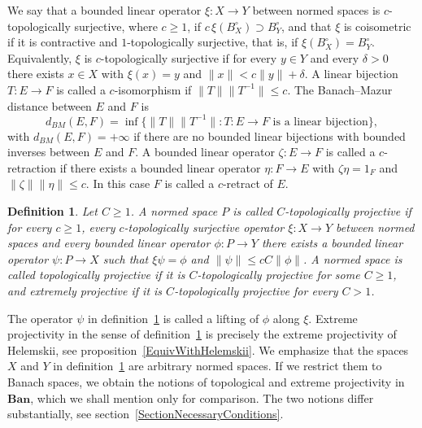 \documentclass[12pt]{article}
\newtheorem{definition}[theorem]{Definition}
\newcommand{\Ban}{\mathbf{Ban}}
\newcommand{\norm}[1]{\lVert #1\rVert}
\newcommand{\BM}{d_{BM}}
\begin{document}
We say that a bounded linear operator
$\xi:X\to Y$ between normed spaces is $c$-topologically surjective, where
$c\geq 1$, if $c\,\xi(B_X^\circ)\supset B_Y^\circ$, and that $\xi$ is
coisometric if it is contractive and $1$-topologically surjective, that is, if
$\xi(B_X^\circ)=B_Y^\circ$. Equivalently, $\xi$ is $c$-topologically surjective
if for every $y\in Y$ and every $\delta>0$ there exists $x\in X$ with
$\xi(x)=y$ and $\norm{x}<c\norm{y}+\delta$. A linear bijection $T:E\to F$ is
called a $c$-isomorphism if $\norm{T}\norm{T^{-1}}\leq c$. The Banach--Mazur
distance between $E$ and $F$ is
\[
\BM(E,F)=\inf\{\norm{T}\norm{T^{-1}}:T:E\to F \mbox{ is a linear bijection}\},
\]
with $\BM(E,F)=+\infty$ if there are no bounded linear bijections with bounded
inverses between $E$ and $F$. A bounded linear operator $\zeta:E\to F$ is
called a $c$-retraction if there exists a bounded linear operator $\eta:F\to E$
with $\zeta\eta=1_F$ and $\norm{\zeta}\norm{\eta}\leq c$. In this case $F$ is
called a $c$-retract of $E$.

\begin{definition}\label{DefTopProj} Let $C\geq 1$. A normed space $P$ is
    called $C$-topologically projective if for every $c\geq 1$, every
    $c$-topologically surjective operator $\xi:X\to Y$ between normed spaces
    and every bounded linear operator $\phi:P\to Y$ there exists a bounded
    linear operator $\psi:P\to X$ such that $\xi\psi=\phi$ and
    $\norm{\psi}\leq cC\norm{\phi}$. A normed space is called topologically
    projective if it is $C$-topologically projective for some $C\geq 1$, and
    extremely projective if it is $C$-topologically projective for every
    $C>1$.
\end{definition}

The operator $\psi$ in definition~\ref{DefTopProj} is called a lifting of
$\phi$ along $\xi$. Extreme projectivity in the sense of
definition~\ref{DefTopProj} is precisely the extreme projectivity of
Helemskii, see proposition~\ref{EquivWithHelemskii}. We emphasize that
the spaces $X$ and $Y$ in definition~\ref{DefTopProj} are arbitrary normed
spaces. If we restrict them to Banach spaces, we obtain the notions of
topological and extreme projectivity in $\Ban$, which we shall mention only
for comparison. The two notions differ substantially, see
section~\ref{SectionNecessaryConditions}.
\end{document}
